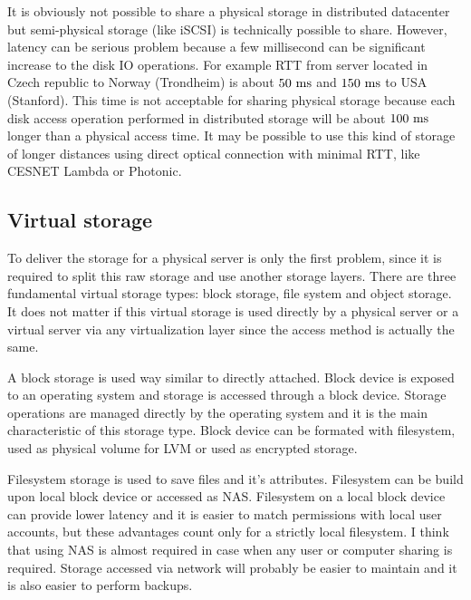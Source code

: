 It is obviously not possible to share a physical storage in distributed datacenter but semi-physical storage (like \Ac{iSCSI}) is technically possible to share. However, latency can be serious problem because a few millisecond can be significant increase to the disk \Ac{IO} operations. For example \Ac{RTT} from server located in Czech republic to Norway (Trondheim) is about $50~\mathrm{ms}$ and $150~\mathrm{ms}$ to USA (Stanford). This time is not acceptable for sharing physical storage because each disk access operation performed in distributed storage will be about $100~\mathrm{ms}$ longer than a physical access time. It may be possible to use this kind of storage of longer distances using direct optical connection with minimal \Ac{RTT}, like CESNET Lambda or Photonic.

\subsection{Virtual storage}

To deliver the storage for a physical server is only the first problem, since it is required to split this raw storage and use another storage layers. There are three fundamental virtual storage types: block storage, file system and object storage. It does not matter if this virtual storage is used directly by a physical server or a virtual server via any virtualization layer since the access method is actually the same.

A block storage is used way similar to directly attached. Block device is exposed to an operating system and storage is accessed through a block device. Storage operations are managed directly by the operating system and it is the main characteristic of this storage type. Block device can be formated with filesystem, used as physical volume for \Ac{LVM} or used as encrypted storage.

Filesystem storage is used to save files and it's attributes. Filesystem can be build upon local block device or accessed as \Ac{NAS}. Filesystem on a local block device can provide lower latency and it is easier to match permissions with local user accounts, but these advantages count only for a strictly local filesystem. I think that using \Ac{NAS} is almost required in case when any user or computer sharing is required. Storage accessed via network will probably be easier to maintain and it is also easier to perform backups. 

